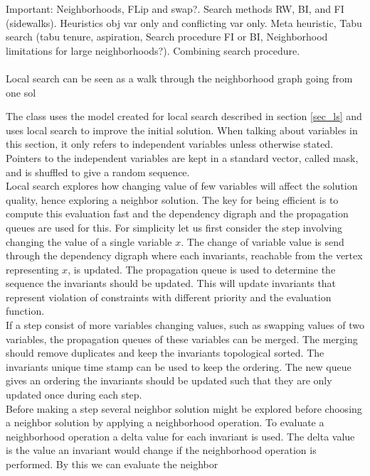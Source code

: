 Important: Neighborhoods, FLip and swap?. Search methods RW, BI, and FI (sidewalks). Heuristics obj var only and 
conflicting var only. Meta heuristic, Tabu search (tabu tenure, aspiration, Search procedure FI or BI, Neighborhood 
limitations for large neighborhoods?). Combining search procedure.  \\ \\ 
Local search can 
be seen as a walk through the neighborhood graph  going from one sol

The  class uses the model created for local search described in section \ref{sec_ls} and 
uses local search to improve the initial solution. When talking about variables in this section, it only refers to 
independent variables unless otherwise stated. Pointers to the independent variables are kept in a standard vector, 
called mask, and is shuffled to give a random sequence.   \\ 
Local search explores how changing value of few variables will affect the solution quality, hence exploring a neighbor 
solution. The key for being efficient is to compute this evaluation fast and the dependency digraph and the propagation 
queues are used for this. For simplicity let us first consider the step involving changing the value of a single 
variable $x$. The change of variable value is send through the dependency digraph where each invariants, reachable from 
the vertex representing $x$, is updated. The propagation queue is used to determine the sequence the invariants should 
be updated. This will update invariants that represent violation of constraints with different priority and the 
evaluation function. \\
If a step consist of more variables changing values, such as swapping values of two variables, the propagation queues 
of these variables can be merged. The merging should remove duplicates and keep the invariants topological sorted. The 
invariants unique time stamp can be used to keep the ordering. The new queue gives an ordering the invariants should be 
updated such that they are only updated once during each step. \\ 
Before making a step several neighbor solution might be explored before choosing a neighbor solution by applying a 
neighborhood operation. To evaluate a neighborhood operation a delta value for each invariant is used. The delta value 
is the value an invariant would change if the neighborhood operation is performed. By this we can evaluate the neighbor 
